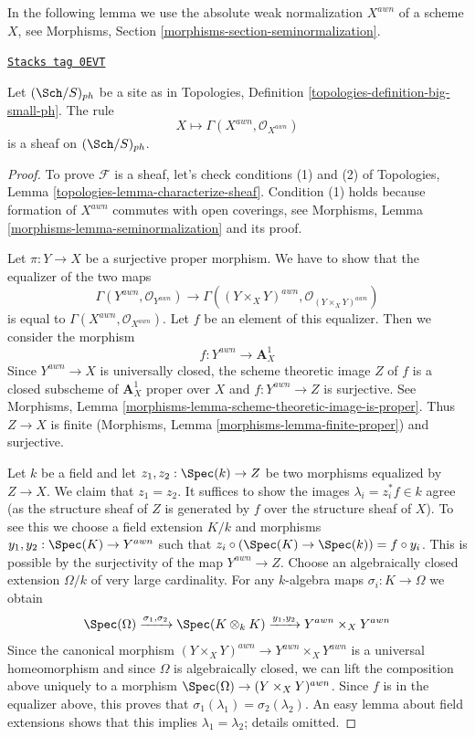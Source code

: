 In the following lemma we use the absolute weak normalization $X^{awn}$
of a scheme $X$, see
Morphisms, Section \ref{morphisms-section-seminormalization}.

\begin{lemma}
\label{flat-lemma-weak-normalization-ph-sheaf}
\href{https://stacks.math.columbia.edu/tag/0EVT}{\texttt{Stacks tag 0EVT}}

Let $(\Sch/S)_{ph}$ be a site as in
Topologies, Definition \ref{topologies-definition-big-small-ph}.
The rule
$$
X \longmapsto \Gamma(X^{awn}, \mathcal{O}_{X^{awn}})
$$
is a sheaf on $(\Sch/S)_{ph}$.
\end{lemma}

\begin{proof}
To prove $\mathcal{F}$ is a sheaf, let's check conditions
(1) and (2) of Topologies, Lemma \ref{topologies-lemma-characterize-sheaf}.
Condition (1) holds because formation of $X^{awn}$ commutes with
open coverings, see Morphisms, Lemma \ref{morphisms-lemma-seminormalization}
and its proof.

\medskip\noindent
Let $\pi : Y \to X$ be a surjective proper morphism. We have to show
that the equalizer of the two maps
$$
\Gamma(Y^{awn}, \mathcal{O}_{Y^{awn}}) \to
\Gamma((Y \times_X Y)^{awn}, \mathcal{O}_{(Y \times_X Y)^{awn}})
$$
is equal to $\Gamma(X^{awn}, \mathcal{O}_{X^{awn}})$. Let $f$ be
an element of this equalizer. Then we consider the morphism
$$
f : Y^{awn} \longrightarrow \mathbf{A}^1_X
$$
Since $Y^{awn} \to X$ is universally closed, the scheme theoretic
image $Z$ of $f$ is a closed subscheme of $\mathbf{A}^1_X$ proper over $X$
and $f : Y^{awn} \to Z$ is surjective.
See Morphisms, Lemma \ref{morphisms-lemma-scheme-theoretic-image-is-proper}.
Thus $Z \to X$ is finite
(Morphisms, Lemma \ref{morphisms-lemma-finite-proper})
and surjective.

\medskip\noindent
Let $k$ be a field and let $z_1, z_2 : \Spec(k) \to Z$ be two
morphisms equalized by $Z \to X$. We claim that $z_1 = z_2$.
It suffices to show the images $\lambda_i = z_i^*f \in k$ agree
(as the structure sheaf of $Z$ is generated by $f$
over the structure sheaf of $X$). To see this we
choose a field extension
$K/k$ and morphisms $y_1, y_2 : \Spec(K) \to Y^{awn}$ such that
$z_i \circ (\Spec(K) \to \Spec(k)) = f \circ y_i$. This is possible
by the surjectivity of the map $Y^{awn} \to Z$. Choose an algebraically
closed extension $\Omega/k$ of very large cardinality.
For any $k$-algebra maps $\sigma_i : K \to \Omega$
we obtain
$$
\Spec(\Omega)
\xrightarrow{\sigma_1, \sigma_2}
\Spec(K \otimes_k K)
\xrightarrow{y_1, y_2}
Y^{awn} \times_X Y^{awn}
$$
Since the canonical morphism
$(Y \times_X Y)^{awn} \to Y^{awn} \times_X Y^{awn}$
is a universal homeomorphism and since $\Omega$ is algebraically closed,
we can lift the composition above uniquely to a morphism
$\Spec(\Omega) \to (Y \times_X Y)^{awn}$. Since $f$ is in the equalizer
above, this proves that $\sigma_1(\lambda_1) = \sigma_2(\lambda_2)$.
An easy lemma about field extensions shows that this implies
$\lambda_1 = \lambda_2$; details omitted.


\end{proof}
